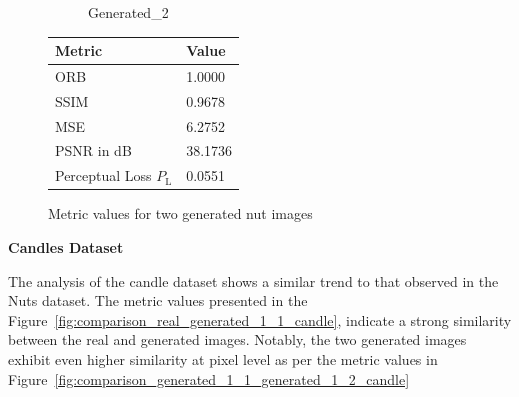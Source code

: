 \documentclass[12pt,DIV14,BCOR12mm,a4paper,footinclude=false,headinclude,parskip=half-,twoside,openright,cleardoublepage=empty,toc=index,bibliography=totoc,listof=totoc]{scrreprt}
\numberwithin{equation}{chapter}
\begin{document}
\begin{figure}
\begin{minipage}[H]{\linewidth}
\begin{minipage}[H]{0.5\linewidth}
\begin{subfigure}[t]{0.48\linewidth}
                \caption{Generated\_2}
            \end{subfigure}
        \end{minipage}%
        \hfill
        \begin{minipage}[H]{0.5\linewidth} %
            \centering
            \small
            \begin{tabular}{p{3cm} p{2cm}}
                \toprule
                \textbf{Metric} & \textbf{Value} \\
                \midrule
                ORB             & 1.0000        \\
                SSIM            & 0.9678        \\
                MSE             & 6.2752        \\
                PSNR in dB      & 38.1736       \\
                Perceptual Loss \( P_{\text{L}} \) & 0.0551        \\
                \bottomrule
            \end{tabular}
        \end{minipage}%
        \caption{Metric values for two generated nut images}
        \label{fig:comparison_metrics_two_generated_nut}
    \end{minipage}
\end{figure}


\textbf{Candles Dataset}

The analysis of the candle dataset shows a similar trend to that observed in the Nuts dataset. The metric values presented in the Figure~\ref{fig:comparison_real_generated_1_1_candle}, indicate a strong similarity between the real and generated images. Notably, the two generated images exhibit even higher similarity at pixel level as per the metric values in Figure~\ref{fig:comparison_generated_1_1_generated_1_2_candle}
\end{document}
